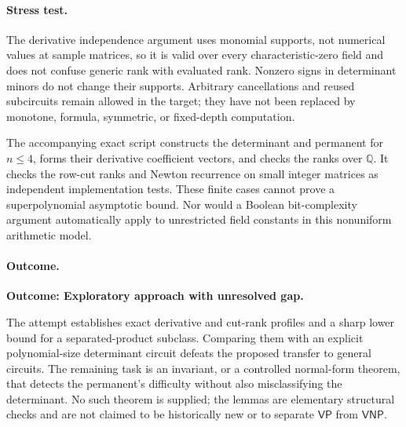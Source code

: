\documentclass[11pt,a4paper]{article}
\newcommand{\Q}{\mathbb{Q}}
\numberwithin{equation}{section}
\begin{document}
\paragraph{Stress test.}
The derivative independence argument uses monomial supports, not numerical
values at sample matrices, so it is valid over every characteristic-zero
field and does not confuse generic rank with evaluated rank. Nonzero signs
in determinant minors do not change their supports. Arbitrary cancellations
and reused subcircuits remain allowed in the target; they have not been
replaced by monotone, formula, symmetric, or fixed-depth computation.

The accompanying exact script constructs the determinant and permanent for
$n\le4$, forms their derivative coefficient vectors, and checks the ranks
over $\Q$. It checks the row-cut ranks and Newton recurrence on small
integer matrices as independent implementation tests. These finite cases
cannot prove a superpolynomial asymptotic bound. Nor would a Boolean
bit-complexity argument automatically apply to unrestricted field constants
in this nonuniform arithmetic model.

\paragraph{Outcome.}
\textbf{Outcome: Exploratory approach with unresolved gap.}

The attempt establishes exact derivative and cut-rank profiles and a sharp
lower bound for a separated-product subclass. Comparing them with an
explicit polynomial-size determinant circuit defeats the proposed transfer
to general circuits. The remaining task is an invariant, or a controlled
normal-form theorem, that detects the permanent's difficulty without also
misclassifying the determinant. No such theorem is supplied; the lemmas
are elementary structural checks and are not claimed to be historically
new or to separate $\mathsf{VP}$ from $\mathsf{VNP}$.

\end{document}
